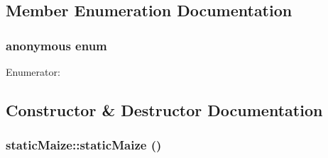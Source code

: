 \subsection{Member Enumeration Documentation}
\hypertarget{classstatic_maize_aba311191464184758a2c2b2eb819a558}{
\subsubsection[{"@19}]{\setlength{\rightskip}{0pt plus 5cm}anonymous enum}}
\label{classstatic_maize_aba311191464184758a2c2b2eb819a558}
\begin{Desc}
\item[Enumerator: ]\par
\begin{description}
\item[{\em 
\hypertarget{classstatic_maize_aba311191464184758a2c2b2eb819a558a6c12b1b6b3c696ced0209428169b25e8}{
Num\_\-of\_\-pr\_\-str}
\label{classstatic_maize_aba311191464184758a2c2b2eb819a558a6c12b1b6b3c696ced0209428169b25e8}
}]\item[{\em 
\hypertarget{classstatic_maize_aba311191464184758a2c2b2eb819a558a2106fe747427a927e52573ab3db6fc46}{
Nitrogen\_\-levels}
\label{classstatic_maize_aba311191464184758a2c2b2eb819a558a2106fe747427a927e52573ab3db6fc46}
}]\end{description}
\end{Desc}



\subsection{Constructor \& Destructor Documentation}
\hypertarget{classstatic_maize_a20270eacb7bcfd32722a00ba5b7cc8d3}{
\subsubsection[{staticMaize}]{\setlength{\rightskip}{0pt plus 5cm}staticMaize::staticMaize ()}}
\label{classstatic_maize_a20270eacb7bcfd32722a00ba5b7cc8d3}


